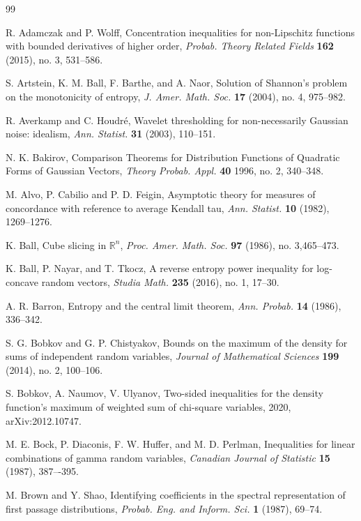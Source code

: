 \documentclass[11pt]{amsart}
\newcommand{\1}{\mathbf{1}}
\newcommand{\R}{\mathbb{R}}
\theoremstyle{definition}
\theoremstyle{definition}
\theoremstyle{remark}
\begin{document}
\begin{thebibliography}{99}

 R. Adamczak and P. Wolff, Concentration inequalities for non-Lipschitz functions with bounded derivatives of higher order, \textit{Probab. Theory Related Fields} \textbf{162}  (2015), no. 3, 531--586. 

 S. Artstein, K. M. Ball, F. Barthe, and A. Naor, Solution of Shannon's problem on the monotonicity of entropy,
\textit{J. Amer. Math. Soc.} \textbf{17} (2004), no. 4, 975--982. 

 R. Averkamp and C. Houdr\'e, Wavelet thresholding for non-necessarily Gaussian noise: idealism, \textit{Ann. Statist.} \textbf{31} (2003), 110--151.

 N. K. Bakirov, Comparison Theorems for Distribution Functions of Quadratic Forms of Gaussian Vectors, \textit{Theory Probab. Appl.} \textbf{40} 1996, no. 2, 340--348.


 M. Alvo, P. Cabilio and P. D. Feigin,  Asymptotic theory for measures of concordance with reference to average Kendall tau,  \textit{Ann. Statist.} \textbf{10} (1982), 1269--1276.

 K. Ball, Cube slicing in $\R^n$, \textit{Proc. Amer. Math. Soc.} \textbf{97} (1986), no. 3,465--473.

 K. Ball, P. Nayar, and T. Tkocz, A reverse entropy power inequality for log-concave random vectors, 
\textit{Studia Math.} \textbf{235} (2016), no. 1, 17--30.

 A. R. Barron, Entropy and the central limit theorem, \textit{Ann. Probab.} \textbf{14} (1986), 336--342.

 S. G. Bobkov and G. P. Chistyakov, Bounds on the maximum of the density for sums of independent random variables, \textit{Journal of Mathematical Sciences} \textbf{199} (2014), no. 2, 100--106.



S. Bobkov, A. Naumov, V. Ulyanov, Two-sided inequalities for the density function’s maximum of weighted sum of chi-square variables, 2020, arXiv:2012.10747.

 M. E. Bock, P. Diaconis, F. W. Huffer, and M. D. Perlman, Inequalities for linear combinations of gamma random variables, \textit{Canadian Journal of Statistic} \textbf{15} (1987), 387–-395.

 M. Brown and Y. Shao,  Identifying coefficients in the spectral representation of first passage distributions, \textit{Probab. Eng. and Inform. Sci.} \textbf{1} (1987), 69--74.


\end{thebibliography}
\end{document}

